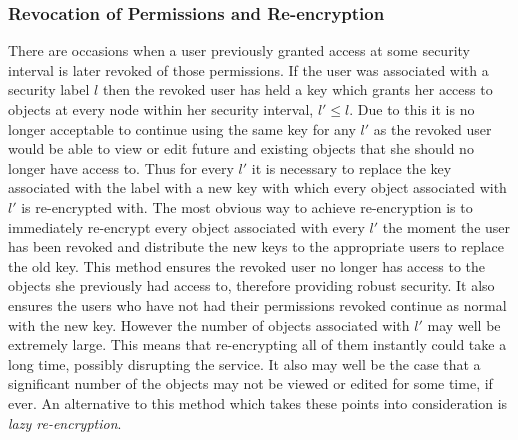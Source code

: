 \documentclass[12pt, titlepage]{article}
\begin{document}
\subsubsection{Revocation of Permissions and Re-encryption}
There are occasions when a user previously granted access at some security interval is later revoked of those permissions. If the user was associated with a security label $l$ then the revoked user has held a key which grants her access to objects at every node within her security interval, $l' \le l$. Due to this it is no longer acceptable to continue using the same key for any $l'$ as the revoked user would be able to view or edit future and existing objects that she should no longer have access to. Thus for every $l'$ it is necessary to replace the key associated with the label with a new key with which every object associated with $l'$ is re-encrypted with.
\newline \indent The most obvious way to achieve re-encryption is to immediately re-encrypt every object associated with every $l'$ the moment the user has been revoked and distribute the new keys to the appropriate users to replace the old key. This method ensures the revoked user no longer has access to the objects she previously had access to, therefore providing robust security. It also ensures the users who have not had their permissions revoked continue as normal with the new key. However the number of objects associated with $l'$ may well be extremely large. This means that re-encrypting all of them instantly could take a long time, possibly disrupting the service. It also may well be the case that a significant number of the objects may not be viewed or edited for some time, if ever. An alternative to this method which takes these points into consideration is \textit{lazy re-encryption}.
\end{document}

